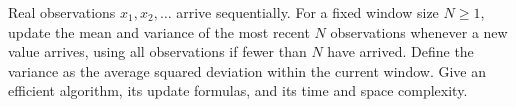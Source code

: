 Real observations $x_1,x_2,\ldots$ arrive sequentially. For a fixed window size $N\ge1$, update the mean and variance of the most recent $N$ observations whenever a new value arrives, using all observations if fewer than $N$ have arrived. Define the variance as the average squared deviation within the current window. Give an efficient algorithm, its update formulas, and its time and space complexity.
